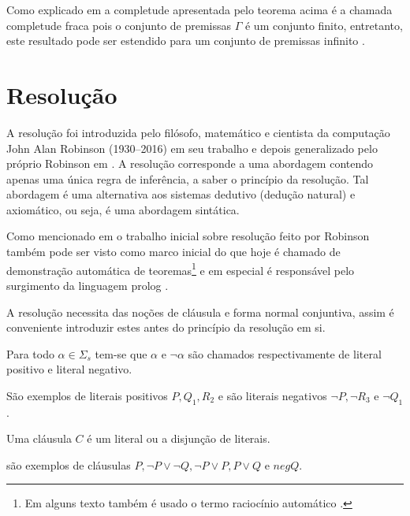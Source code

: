 Como explicado em \cite{joaoPavao2014} a completude apresentada pelo teorema acima é a chamada completude fraca pois o conjunto de premissas $\Gamma$ é um conjunto finito, entretanto, este resultado pode ser estendido para um conjunto de premissas infinito \cite{joaoPavao2014}.

\section{Resolução}

A resolução foi introduzida pelo filósofo, matemático e cientista da computação John Alan Robinson (1930--2016) em seu trabalho \cite{robinson1965} e depois generalizado pelo próprio Robinson em \cite{robinson1983}. A resolução corresponde a uma abordagem contendo apenas uma única regra de inferência, a saber o princípio da resolução. Tal abordagem é uma alternativa aos sistemas dedutivo (dedução natural) e axiomático, ou seja, é uma abordagem sintática.

Como mencionado em \cite{joaoPavao2014} o trabalho inicial sobre resolução feito por Robinson também pode ser visto como marco inicial do que hoje é chamado de demonstração automática de teoremas\footnote{Em alguns texto também é usado o termo raciocínio automático \cite{robinson2001, wos1988}.} e em especial é responsável pelo surgimento da linguagem prolog \cite{ayala2014}.

A resolução necessita das noções de cláusula e forma normal conjuntiva, assim é conveniente introduzir estes antes do princípio da resolução em si.

\begin{definition}[Literais]\label{def:Literais}
    Para todo $\alpha \in \Sigma_s$ tem-se que $\alpha$ e $\neg \alpha$ são chamados respectivamente de literal positivo e literal negativo.
\end{definition}

\begin{exem}
    São exemplos de literais positivos $P, Q_1, R_2$ e são literais negativos $\neg P, \neg R_3$ e $\neg Q_1$.
\end{exem}

\begin{definition}[cláusula]\label{def:cláusula}
    Uma cláusula $C$ é um literal ou a disjunção de literais.
\end{definition}

\begin{exem}
    são exemplos de cláusulas $P, \neg P \lor \neg Q, \neg P \lor P, P \lor Q$ e $neg Q$.
\end{exem}

